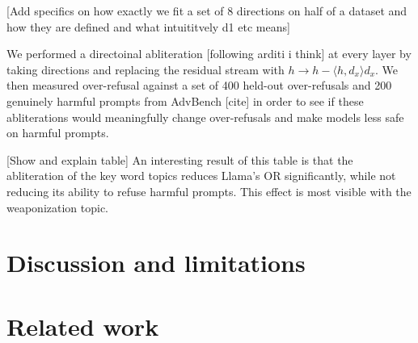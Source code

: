 \documentclass{article}
\begin{document}
[Add specifics on how exactly we fit a set of 8 directions on half of a dataset and how they are defined and what intuititvely d1 etc means]

We performed a directoinal abliteration [following arditi i think] at every layer by taking directions and replacing the residual stream with $h \rightarrow h - \langle h, d_x \rangle d_x$. We then measured over-refusal against a set of 400 held-out over-refusals and 200 genuinely harmful prompts from AdvBench [cite] in order to see if these abliterations would meaningfully change over-refusals and make models less safe on harmful prompts. 

[Show and explain table]
An interesting result of this table is that the abliteration of the key word topics reduces Llama's OR significantly, while not reducing its ability to refuse harmful prompts. This effect is most visible with the weaponization topic. 



\section{Discussion and limitations}




\section{Related work}
\end{document}
